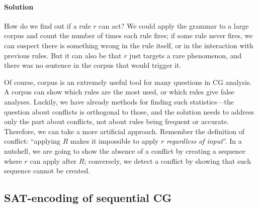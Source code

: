
\paragraph{Solution}

How do we find out if a rule $r$ can act? 
We could apply the grammar to a large corpus and count the number of times 
each rule fires; if some rule never fires, we can suspect there is something wrong 
in the rule itself, or in the interaction with previous rules. 
But it can also be that $r$ just targets a rare phenomenon, and there was no sentence in the corpus that would trigger it.

Of course, corpus is an extremely useful tool for many questions in CG analysis.
A corpus can show which rules are the most used, or which rules give false analyses. 
Luckily, we have already methods for finding such statistics---the question 
about conflicts is orthogonal to those, and the solution needs to address only 
the part about conflicts, not about rules being frequent or accurate.
Therefore, we can take a more artificial approach. %
Remember the definition of conflict: ``applying $R$ makes it impossible to apply $r$ \emph{regardless of input}''.
In a nutshell, we are going to show the absence of a conflict by creating 
a sequence where $r$ can apply after $R$; conversely, we detect a conflict by 
showing that such sequence cannot be created.




\def\newVar{$\text{\em word}'_\textsc{ RD}$}
\def\oldVar{$\text{\em word}_\textsc{\,RD}$}
\def\eqdef{\Coloneqq}
\def\invConds{\text{invalid condition}}
\def\onlyTrgLeft{\text{only target left}}

\subsection{SAT-encoding of sequential CG}
\label{sec:orderedScheme}

